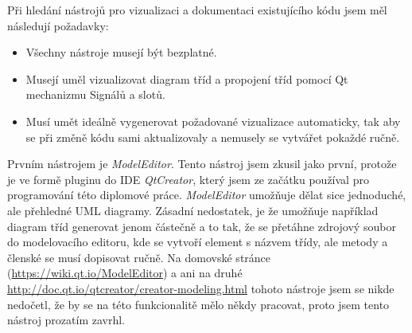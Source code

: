 
\listofappendices


Při hledání nástrojů pro vizualizaci a dokumentaci existujícího kódu jsem měl následují požadavky:

\begin{itemize}
	\item Všechny nástroje musejí být bezplatné.
	\item Musejí uměl vizualizovat diagram tříd a propojení tříd pomocí Qt mechanizmu Signálů a slotů.
	\item Musí umět ideálně vygenerovat požadované vizualizace automaticky, tak aby se při změně kódu sami aktualizovaly a nemusely se vytvářet pokaždé ručně.
\end{itemize}


Prvním nástrojem je \textit{ModelEditor}. Tento nástroj jsem zkusil jako první, protože je ve formě pluginu do IDE \textit{QtCreator}, který jsem ze začátku používal pro programování této diplomové práce. \textit{ModelEditor} umožňuje dělat sice jednoduché, ale přehledné UML diagramy. Zásadní nedostatek, je že umožňuje například diagram tříd generovat jenom částečně a to tak, že se přetáhne zdrojový soubor do modelovacího editoru, kde se vytvoří element s názvem třídy, ale metody a členské se musí dopisovat ručně. Na domovské stránce (\url{https://wiki.qt.io/ModelEditor}) a ani na druhé \url{http://doc.qt.io/qtcreator/creator-modeling.html} tohoto nástroje jsem se nikde nedočetl, že by se na této funkcionalitě mělo někdy pracovat, proto jsem tento nástroj prozatím zavrhl.


